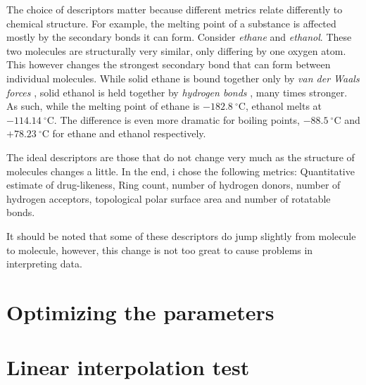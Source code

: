 The choice of descriptors matter because different metrics relate differently to chemical structure. For example, the melting point of a substance is affected mostly by the secondary bonds it can form. Consider \textit{ethane} and \textit{ethanol}. These two molecules are structurally very similar, only differing by one oxygen atom. This however changes the strongest secondary bond that can form between individual molecules. While solid ethane is bound together only by \textit{van der Waals forces} \cite{bib:vanderwaals}, solid ethanol is held together by \textit{hydrogen bonds} \cite{bib:hbond}, many times stronger. As such, while the melting point of ethane is $-182.8~^\circ$C, ethanol melts at $-114.14~^\circ$C. The difference is even more dramatic for boiling points, $-88.5~^\circ$C and $+78.23~^\circ$C for ethane and ethanol respectively.

The ideal descriptors are those that do not change very much as the structure of molecules changes a little. In the end, i chose the following metrics: Quantitative estimate of drug-likeness, Ring count, number of hydrogen donors, number of hydrogen acceptors, topological polar surface area \cite{bib:tpsa} and number of rotatable bonds.

It should be noted that some of these descriptors do jump slightly from molecule to molecule, however, this change is not too great to cause problems in interpreting data.



\section{Optimizing the parameters}\label{sec:optimizing-the-parameters}



\section{Linear interpolation test}\label{sec:linear-interpolation-test}

